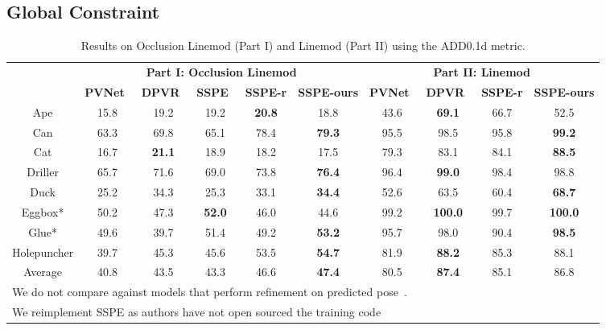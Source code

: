 \documentclass{article}
\begin{document}
\subsection{Global Constraint}











\begin{table}[t]
\centering
\caption{Results on Occlusion Linemod (Part I) and Linemod (Part II) using the ADD0.1d metric.}
\label{tab:results-occlinemod}
\centering 
\scriptsize
\begin{tabular}{ c | c c c c c | c c c c }
\hline
& \multicolumn{5}{c|}{\textbf{Part I: Occlusion Linemod}} &  \multicolumn{4}{c}{\textbf{Part II: Linemod}}\\
& \textbf{PVNet}~\cite{peng2019pvnet} & \textbf{DPVR}~\cite{proxyvoting} & \textbf{SSPE}~\cite{hu2020single} & \textbf{SSPE-r} & \textbf{SSPE-ours} & \textbf{PVNet}~\cite{peng2019pvnet} & \textbf{DPVR}~\cite{proxyvoting} & \textbf{SSPE-r} & \textbf{SSPE-ours}\\
\hline
Ape & 15.8 & 19.2 & 19.2 & \textbf{20.8} & 18.8 & 43.6 & \textbf{69.1} & 66.7 & 52.5\\
Can & 63.3 & 69.8 & 65.1 & 78.4 & \textbf{79.3} & 95.5 & 98.5 & 95.8 & \textbf{99.2}\\
Cat & 16.7 & \textbf{21.1} & 18.9 & 18.2 & 17.5 & 79.3 & 83.1 & 84.1 & \textbf{88.5}\\
Driller & 65.7 & 71.6 & 69.0 & 73.8 & \textbf{76.4} & 96.4 & \textbf{99.0} & 98.4 & 98.8\\
Duck & 25.2 & 34.3 & 25.3 & 33.1 & \textbf{34.4} & 52.6 & 63.5 & 60.4 & \textbf{68.7}\\
Eggbox* & 50.2 & 47.3 & \textbf{52.0} & 46.0 & 44.6 & 99.2 & \textbf{100.0} & 99.7 & \textbf{100.0}\\
Glue* & 49.6 & 39.7 & 51.4 & 49.2 & \textbf{53.2} & 95.7 & 98.0 & 90.4 & \textbf{98.5}\\
Holepuncher & 39.7 & 45.3 & 45.6 & 53.5 & \textbf{54.7} & 81.9 & \textbf{88.2} & 85.3 & 88.1\\
\hline
Average & 40.8 & 43.5 & 43.3 & 46.6 & \textbf{47.4} & 80.5 & \textbf{87.4} & 85.1 & 86.8\\
\hline

\multicolumn{10}{l}{We do not compare against models that perform refinement on predicted pose~\cite{li2018deepim}\cite{wang2019densefusion}.}\\
\multicolumn{10}{l}{We reimplement SSPE as authors have not open sourced the training code}
\end{tabular}
\end{table}
\end{document}
